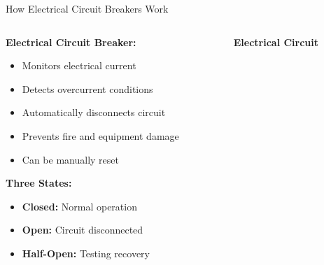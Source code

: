 \documentclass[aspectratio=169]{beamer}
\newcommand{\circuitopen}{\textcolor{red}{\faTimesCircle}}
\newcommand{\circuitclosed}{\textcolor{green}{\faCheckCircle}}
\newcommand{\circuithalf}{\textcolor{orange}{\faAdjust}}
\begin{document}
\begin{frame}{How Electrical Circuit Breakers Work}
    \begin{columns}
        \begin{column}{0.5\textwidth}
            \textbf{Electrical Circuit Breaker:}
            \begin{itemize}
                \item Monitors electrical current
                \item Detects overcurrent conditions
                \item Automatically disconnects circuit
                \item Prevents fire and equipment damage
                \item Can be manually reset
            \end{itemize}
            
            \vspace{0.5cm}
            \textbf{Three States:}
            \begin{itemize}
                \item[\circuitclosed] \textbf{Closed:} Normal operation
                \item[\circuitopen] \textbf{Open:} Circuit disconnected
                \item[\circuithalf] \textbf{Half-Open:} Testing recovery
            \end{itemize}
        \end{column}
        \begin{column}{0.5\textwidth}
            \begin{center}
                \textbf{Electrical Circuit}
\end{center}
\end{column}
\end{columns}
\end{frame}
\end{document}
